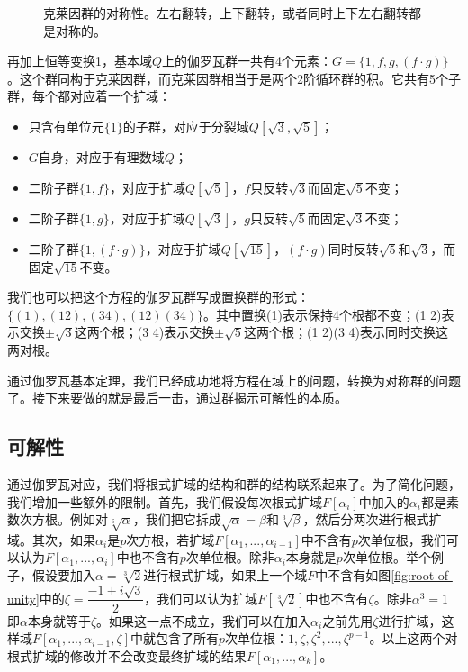 \documentclass{article}
\begin{document}
\begin{figure}
\centering
{}
\captionsetup{labelformat=empty}
\caption{克莱因群的对称性。左右翻转，上下翻转，或者同时上下左右翻转都是对称的。}
\label{fig:Klein-four-group}
\end{figure}

再加上恒等变换1，基本域$Q$上的伽罗瓦群一共有4个元素：$G = \{1, f, g, (f \cdot g)\}$。这个群同构于克莱因群，而克莱因群相当于是两个2阶循环群的积。它共有5个子群，每个都对应着一个扩域：

\begin{itemize}
\item 只含有单位元$\{1\}$的子群，对应于分裂域$Q[\sqrt{3}, \sqrt{5}]$；
\item $G$自身，对应于有理数域$Q$；
\item 二阶子群$\{1, f\}$，对应于扩域$Q[\sqrt{5}]$，$f$只反转$\sqrt{3}$而固定$\sqrt{5}$不变；
\item 二阶子群$\{1, g\}$，对应于扩域$Q[\sqrt{3}]$，$g$只反转$\sqrt{5}$而固定$\sqrt{3}$不变；
\item 二阶子群$\{1, (f \cdot g)\}$，对应于扩域$Q[\sqrt{15}]$，$(f \cdot g)$同时反转$\sqrt{5}$和$\sqrt{3}$，而固定$\sqrt{15}$不变。
\end{itemize}

我们也可以把这个方程的伽罗瓦群写成置换群的形式：$\{(1), (1 2), (3 4), (1 2)(3 4)\}$。其中置换(1)表示保持4个根都不变；(1 2)表示交换$\pm \sqrt{3}$这两个根；(3 4)表示交换$\pm \sqrt{5}$这两个根；(1 2)(3 4)表示同时交换这两对根。

通过伽罗瓦基本定理，我们已经成功地将方程在域上的问题，转换为对称群的问题了。接下来要做的就是最后一击，通过群揭示可解性的本质。

\subsection{可解性}

通过伽罗瓦对应，我们将根式扩域的结构和群的结构联系起来了。为了简化问题，我们增加一些额外的限制。首先，我们假设每次根式扩域$F[\alpha_i]$中加入的$\alpha_i$都是素数次方根。例如对$\sqrt[6]{\alpha}$，我们把它拆成$\sqrt{\alpha} = \beta$和$\sqrt[3]{\beta}$，然后分两次进行根式扩域。其次，如果$\alpha_i$是$p$次方根，若扩域$F[\alpha_1, ..., \alpha_{i-1}]$中不含有$p$次单位根，我们可以认为$F[\alpha_1, ..., \alpha_i]$中也不含有$p$次单位根。除非$\alpha_i$本身就是$p$次单位根。举个例子，假设要加入$\alpha = \sqrt[3]{2}$进行根式扩域，如果上一个域$F$中不含有如图\ref{fig:root-of-unity}中的$\zeta = \dfrac{-1 + i\sqrt{3}}{2}$，我们可以认为扩域$F[\sqrt[3]{2}]$中也不含有$\zeta$。除非$\alpha^3 = 1$即$\alpha$本身就等于$\zeta$。如果这一点不成立，我们可以在加入$\alpha_i$之前先用$\zeta$进行扩域，这样域$F[\alpha_1, ..., \alpha_{i-1}, \zeta]$中就包含了所有$p$次单位根：$1, \zeta, \zeta^2, ..., \zeta^{p-1}$。以上这两个对根式扩域的修改并不会改变最终扩域的结果$F[\alpha_1, ..., \alpha_k]$。
\end{document}
